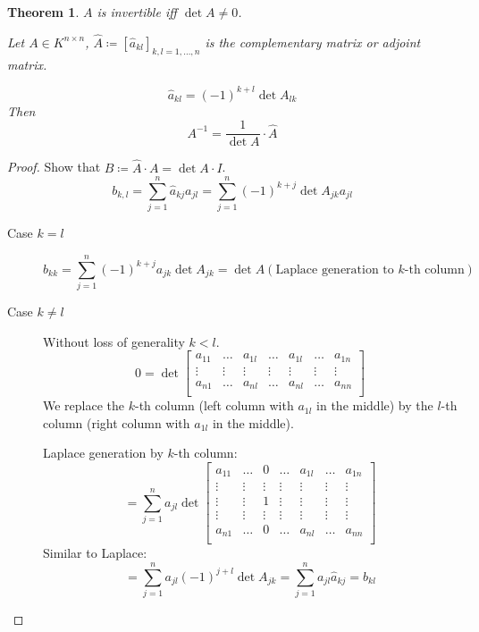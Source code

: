 \documentclass[a4paper,landscape,twocolumn]{article}
\newtheorem{theorem}{Theorem}
\begin{document}
\begin{theorem}
  \label{satz-7.39}
  $A$ is invertible iff $\det{A} \neq 0$.

  Let $A \in K^{n \times n}$, $\hat{A} \coloneqq [\hat{a}_{kl}]_{k,l=1,\ldots,n}$
  is the \emph{complementary matrix} or \emph{adjoint matrix}.

  \[ \hat{a}_{kl} = (-1)^{k+l} \det{A_{lk}} \]
  Then
  \[ A^{-1} = \frac{1}{\det{A}} \cdot \hat{A} \]
\end{theorem}
\begin{proof}
  Show that $B \coloneqq \hat{A} \cdot A = \det{A} \cdot I$.
  \[ b_{k,l} = \sum_{j=1}^n \hat{a}_{kj} a_{jl} = \sum_{j=1}^n (-1)^{k+j} \det{A}_{jk} a_{jl} \]
  \begin{description}
    \item[Case $k=l$]
      \[ b_{kk} = \sum_{j=1}^n (-1)^{k+j} a_{jk} \det{A}_{jk} = \det{A} \left(\text{Laplace generation to $k$-th column}\right) \]
    \item[Case $k\neq l$]
      Without loss of generality $k < l$.
      \[
        0 = \det\begin{bmatrix}
          a_{11} & \ldots & a_{1l} & \ldots & a_{1l} & \ldots & a_{1n} \\
          \vdots & \vdots & \vdots & \vdots & \vdots & \vdots & \vdots \\
          a_{n1} & \ldots & a_{nl} & \ldots & a_{nl} & \ldots & a_{nn} \\
        \end{bmatrix}
      \]
      We replace the $k$-th column (left column with $a_{1l}$ in the middle)
      by the $l$-th column (right column with $a_{1l}$ in the middle).

      Laplace generation by $k$-th column:
      \[
        = \sum_{j=1}^n a_{jl} \det\begin{bmatrix}
          a_{11} & \ldots & 0 & \ldots & a_{1l} & \ldots & a_{1n} \\
          \vdots & \vdots & \vdots & \vdots & \vdots & \vdots & \vdots \\
          \vdots & \vdots & 1 & \vdots & \vdots & \vdots & \vdots \\
          \vdots & \vdots & \vdots & \vdots & \vdots & \vdots & \vdots \\
          a_{n1} & \ldots & 0 & \ldots & a_{nl} & \ldots & a_{nn} \\
        \end{bmatrix}
      \]
      Similar to Laplace:
      \[ = \sum_{j=1}^n a_{jl} (-1)^{j+l} \det{A_{jk}} = \sum_{j=1}^n a_{jl} \hat{a}_{kj} = b_{kl} \]
  \end{description}
\end{proof}
\end{document}
